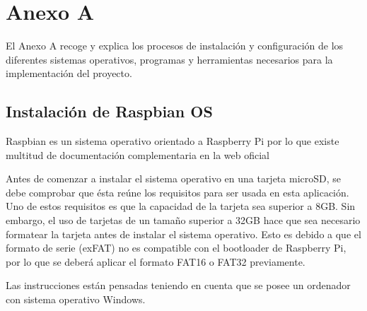 \chapter{Anexo A}

El Anexo A recoge y explica los procesos de instalación y configuración de los diferentes sistemas operativos, programas y herramientas necesarios para la implementación del proyecto.



\section{Instalación de Raspbian OS}\label{anexo:raspbian}

Raspbian es un sistema operativo orientado a Raspberry Pi por lo que existe multitud de documentación complementaria en la web oficial\cite{Raspberry:2019}

Antes de comenzar a instalar el sistema operativo en una tarjeta microSD, se debe comprobar que ésta reúne los requisitos para ser usada en esta aplicación. Uno de estos requisitos es que la capacidad de la tarjeta sea superior a 8GB. Sin embargo, el uso de tarjetas de un tamaño superior a 32GB hace que sea necesario formatear la tarjeta antes de instalar el sistema operativo. Esto es debido a que el formato de serie (exFAT) no es compatible con el bootloader de Raspberry Pi, por lo que se deberá aplicar el formato FAT16 o FAT32 previamente.

Las instrucciones están pensadas teniendo en cuenta que se posee un ordenador con sistema operativo Windows.

